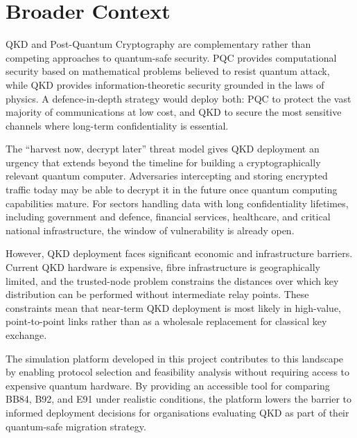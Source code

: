 \documentclass[10pt, a4paper]{report}
\begin{document}

\section{Broader Context}

QKD and Post-Quantum Cryptography are complementary rather than competing approaches to quantum-safe security. PQC provides computational security based on mathematical problems believed to resist quantum attack, while QKD provides information-theoretic security grounded in the laws of physics. A defence-in-depth strategy would deploy both: PQC to protect the vast majority of communications at low cost, and QKD to secure the most sensitive channels where long-term confidentiality is essential.

The ``harvest now, decrypt later'' threat model gives QKD deployment an urgency that extends beyond the timeline for building a cryptographically relevant quantum computer. Adversaries intercepting and storing encrypted traffic today may be able to decrypt it in the future once quantum computing capabilities mature. For sectors handling data with long confidentiality lifetimes, including government and defence, financial services, healthcare, and critical national infrastructure, the window of vulnerability is already open.

However, QKD deployment faces significant economic and infrastructure barriers. Current QKD hardware is expensive, fibre infrastructure is geographically limited, and the trusted-node problem constrains the distances over which key distribution can be performed without intermediate relay points. These constraints mean that near-term QKD deployment is most likely in high-value, point-to-point links rather than as a wholesale replacement for classical key exchange.

The simulation platform developed in this project contributes to this landscape by enabling protocol selection and feasibility analysis without requiring access to expensive quantum hardware. By providing an accessible tool for comparing BB84, B92, and E91 under realistic conditions, the platform lowers the barrier to informed deployment decisions for organisations evaluating QKD as part of their quantum-safe migration strategy.


\end{document}
